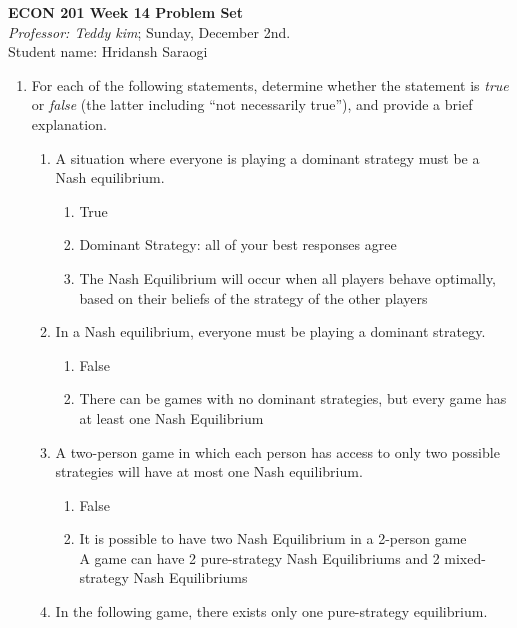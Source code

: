 \documentclass[11pt]{article}
\begin{document}
\begin{center}
\textbf{ECON 201 Week 14 Problem Set}\\
\textit {Professor: Teddy kim};  
Sunday, December 2nd.
\\Student name: Hridansh Saraogi
\end{center}

\begin{enumerate}
\item For each of the following statements, determine whether
the statement is \emph{true} or \emph{false} (the latter including ``not necessarily true''), and provide a brief explanation.
    \begin{enumerate}
    \item A situation where everyone is playing a dominant strategy must be a Nash equilibrium.
    \begin{enumerate}
        \item True
        \item Dominant Strategy: all of your best responses agree
        \item The Nash Equilibrium will occur when all players behave optimally, based on their beliefs of the strategy of the other players
    \end{enumerate}

    \item In a Nash equilibrium, everyone must be playing a dominant strategy.
    \begin{enumerate}
        \item False
        \item There can be games with no dominant strategies, but every game has at least one Nash Equilibrium
    \end{enumerate}

    \item A two-person game in which each person has access to only two possible strategies will have at most one Nash equilibrium.
    \begin{enumerate}
        \item False
        \item It is possible to have two Nash Equilibrium in a 2-person game
        \\ A game can have 2 pure-strategy Nash Equilibriums and 2 mixed-strategy Nash Equilibriums
    \end{enumerate}

    \item In the following game, there exists only one pure-strategy equilibrium.
        \begin{figure}[h!]
    \begin{center}
\begin{tikzpicture}[scale=0.6]
	

\end{tikzpicture}
\end{center}
\end{figure}
\end{enumerate}
\end{enumerate}
\end{document}
